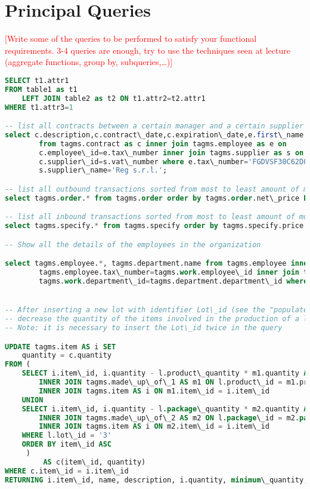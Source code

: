 \section{Principal Queries}
\textcolor{red}{[Write some of the queries to be performed to satisfy your functional requirements. 3-4 queries are enough, try to use the techniques seen at lecture (aggregate functions, group by, subqueries,…)]}

\begin{lstlisting}[language=SQL,
keywordstyle=\color{blue},
stringstyle=\color{mauve},
showstringspaces=false,
basicstyle=\ttfamily\footnotesize]
SELECT t1.attr1
FROM table1 as t1
    LEFT JOIN table2 as t2 ON t1.attr2=t2.attr1 
WHERE t1.attr3=1

-- list all contracts between a certain manager and a certain supplier
select c.description,c.contract\_date,c.expiration\_date,e.first\_name as manager\_name,e.last\_name as manager\_surname
		from tagms.contract as c inner join tagms.employee as e on
        c.employee\_id=e.tax\_number inner join tagms.supplier as s on
        c.supplier\_id=s.vat\_number where e.tax\_number='FGDVSF30C62D012T' and
        s.supplier\_name='Reg s.r.l.';

-- list all outbound transactions sorted from most to least amount of money:
select tagms.order.* from tagms.order order by tagms.order.net\_price DESC;

-- list all inbound transactions sorted from most to least amount of money:
select tagms.specify.* from tagms.specify order by tagms.specify.price DESC;

-- Show all the details of the employees in the organization

select tagms.employee.*, tagms.department.name from tagms.employee inner join tagms.work on
        tagms.employee.tax\_number=tagms.work.employee\_id inner join tagms.department on
        tagms.work.department\_id=tagms.department.department\_id where tagms.employee.still\_working=TRUE;


-- After inserting a new lot with identifier Lot\_id (see the "populate" section)
-- decrease the quantity of the items involved in the production of a lot
-- Note: it is necessary to insert the Lot\_id twice in the query

UPDATE tagms.item AS i SET
    quantity = c.quantity
FROM (
    SELECT i.item\_id, i.quantity - l.product\_quantity * m1.quantity AS quantity FROM tagms.lot AS l
        INNER JOIN tagms.made\_up\_of\_1 AS m1 ON l.product\_id = m1.product\_id
        INNER JOIN tagms.item AS i ON m1.item\_id = i.item\_id
    UNION
    SELECT i.item\_id, i.quantity - l.package\_quantity * m2.quantity AS quantity FROM tagms.lot AS l
        INNER JOIN tagms.made\_up\_of\_2 AS m2 ON l.package\_id = m2.package\_id
        INNER JOIN tagms.item AS i ON m2.item\_id = i.item\_id
    WHERE l.lot\_id = '3'
    ORDER BY item\_id ASC
     )
         AS c(item\_id, quantity)
WHERE c.item\_id = i.item\_id
RETURNING i.item\_id, name, description, i.quantity, minimum\_quantity, item\_category\_id;




\end{lstlisting}
